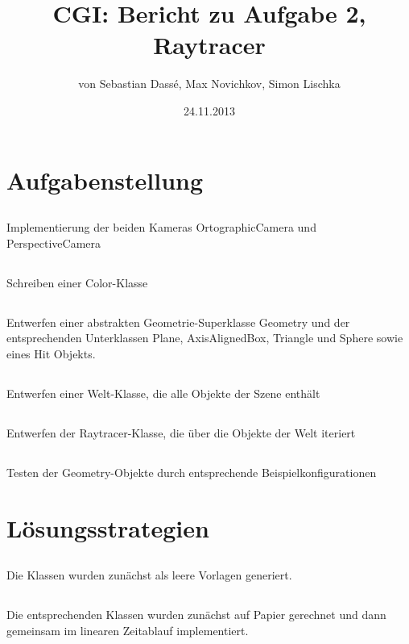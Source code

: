 \documentclass[11pt]{amsart}
\title{CGI: Bericht zu Aufgabe 2, Raytracer}
\author{von Sebastian Dass\'{e}, Max Novichkov, Simon Lischka }
\date{24.11.2013}
\begin{document}
\maketitle

\section{Aufgabenstellung}
\subsection{}
Implementierung der beiden Kameras OrtographicCamera und PerspectiveCamera

\subsection{}
Schreiben einer Color-Klasse

\subsection{}
Entwerfen einer abstrakten Geometrie-Superklasse Geometry und der entsprechenden Unterklassen Plane, AxisAlignedBox, Triangle und Sphere sowie eines Hit Objekts. 
\subsection{} 
Entwerfen einer Welt-Klasse, die alle Objekte der Szene enthält
\subsection{} 
Entwerfen der Raytracer-Klasse, die über die Objekte der Welt iteriert
\subsection{}
Testen der Geometry-Objekte durch entsprechende Beispielkonfigurationen

\section{L\"osungsstrategien}
\subsection{}
Die Klassen wurden zun\"achst als leere Vorlagen generiert.

\subsection{}
Die entsprechenden Klassen wurden zun\"achst auf Papier
gerechnet und dann gemeinsam im linearen Zeitablauf implementiert.
\end{document}
